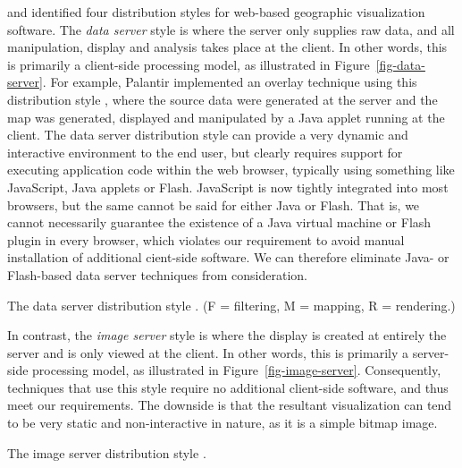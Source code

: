 \documentclass[acmtocl,acmnow]{acmtrans2m}
\begin{document}
 and  identified four
distribution styles for web-based geographic visualization software. The
\emph{data server} style is where the server only supplies raw data, and
all manipulation, display and analysis takes place at the client. In
other words, this is primarily a client-side processing model, as
illustrated in Figure~\ref{fig-data-server}. For example, Palantir
implemented an overlay technique using this distribution style
\cite{Papa-N-1998-Palantir}, where the source data were generated at the
server and the map was generated, displayed and manipulated by a Java
applet running at the client. The data server distribution style can
provide a very dynamic and interactive environment to the end user, but
clearly requires support for executing application code within the web
browser, typically using something like JavaScript, Java applets or
Flash. JavaScript is now tightly integrated into most browsers, but the
same cannot be said for either Java or Flash. That is, we cannot
necessarily guarantee the existence of a Java virtual machine or Flash
plugin in every browser, which violates our requirement to avoid manual
installation of additional cient-side software. We can therefore
eliminate Java- or Flash-based data server techniques from
consideration.


\begin{narrowfig}{2cm}
	\caption{The data server distribution style
	\protect\cite{Wood-J-1996-vis}. (F = filtering, M = mapping, R =
	rendering.)}
	\label{fig-data-server}
\end{narrowfig}


In contrast, the \emph{image server} style is where the display is
created at entirely the server and is only viewed at the client. In
other words, this is primarily a server-side processing model, as
illustrated in Figure~\ref{fig-image-server}. Consequently, techniques
that use this style require no additional client-side software, and thus
meet our requirements. The downside is that the resultant visualization
can tend to be very static and non-interactive in nature, as it is a
simple bitmap image.


\begin{narrowfig}{2cm}
	\caption{The image server distribution style
	\protect\cite{Wood-J-1996-vis}.}
	\label{fig-image-server}
\end{narrowfig}
\end{document}
